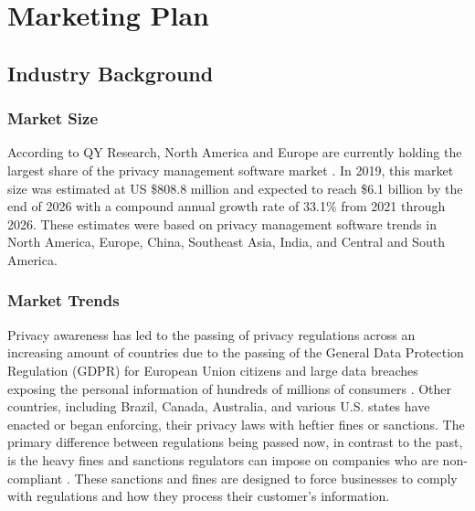 {\let\cleardoublepage\relax \chapter*{Marketing Plan}}



\section{Industry Background}

\subsection{Market Size} \label{market.size}

According to QY Research, North America and Europe are currently holding the largest share of the privacy management software market \cite{qy.2020}. In 2019, this market size was estimated at US \$808.8 million and expected to reach \$6.1 billion by the end of 2026 with a compound annual growth rate of 33.1\% from 2021 through 2026. These estimates were based on privacy management software trends in North America, Europe, China, Southeast Asia, India, and Central and South America.

\subsection{Market Trends} \label{marketing.trends}


Privacy awareness has led to the passing of privacy regulations across an increasing amount of countries due to the passing of the General Data Protection Regulation (GDPR) for European Union citizens and large data breaches exposing the personal information of hundreds of millions of consumers \cite{privacypolicies.2019}. Other countries, including Brazil, Canada, Australia, and various U.S. states have enacted or began enforcing, their privacy laws with heftier fines or sanctions. The primary difference between regulations being passed now, in contrast to the past, is the heavy fines and sanctions regulators can impose on companies who are non-compliant \cite{tr.2020}. These sanctions and fines are designed to force businesses to comply with regulations and how they process their customer's information.

